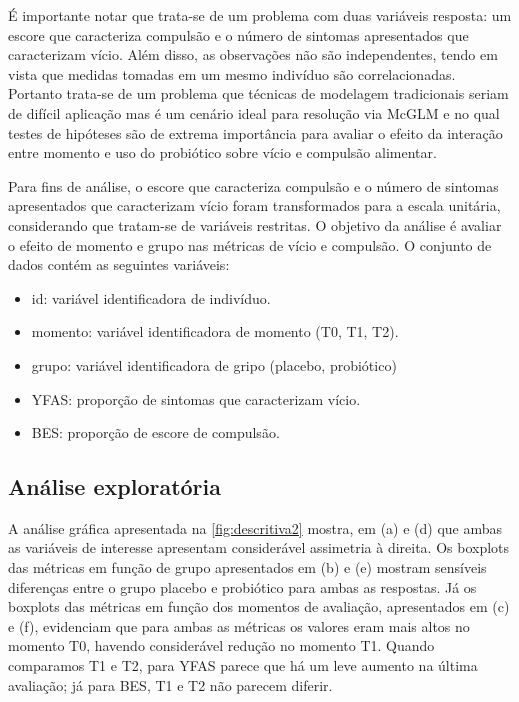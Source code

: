 É importante notar que trata-se de um problema com duas variáveis resposta: um escore que caracteriza compulsão e o número de sintomas apresentados que caracterizam vício. Além disso, as observações não são independentes, tendo em vista que medidas tomadas em um mesmo indivíduo são correlacionadas. Portanto trata-se de um problema que técnicas de modelagem tradicionais seriam de difícil aplicação mas é um cenário ideal para resolução via McGLM e no qual testes de hipóteses são de extrema importância para avaliar o efeito da interação entre momento e uso do probiótico sobre vício e compulsão alimentar.

Para fins de análise, o escore que caracteriza compulsão e o número de sintomas apresentados que caracterizam vício foram transformados para a escala unitária, considerando que tratam-se de variáveis restritas. O objetivo da análise é avaliar o efeito de momento e grupo nas métricas de vício e compulsão. O conjunto de dados contém as seguintes variáveis:

\begin{itemize}
  \item id: variável identificadora de indivíduo.
  \item momento: variável identificadora de momento (T0, T1, T2).
  \item grupo: variável identificadora de gripo (placebo, probiótico)
  \item YFAS: proporção de sintomas que caracterizam vício.
  \item BES: proporção de escore de compulsão.
\end{itemize}


\subsection{Análise exploratória}

A análise gráfica apresentada na \autoref{fig:descritiva2} mostra, em (a) e (d) que ambas as variáveis de interesse apresentam considerável assimetria à direita. Os boxplots das métricas em função de grupo apresentados em (b) e (e) mostram sensíveis diferenças entre o grupo placebo e probiótico para ambas as respostas. Já os boxplots das métricas em função dos momentos de avaliação, apresentados em (c) e (f), evidenciam que para ambas as métricas os valores eram mais altos no momento T0, havendo considerável redução no momento T1. Quando comparamos T1 e T2, para YFAS parece que há um leve aumento na última avaliação; já para BES, T1 e T2 não parecem diferir.


